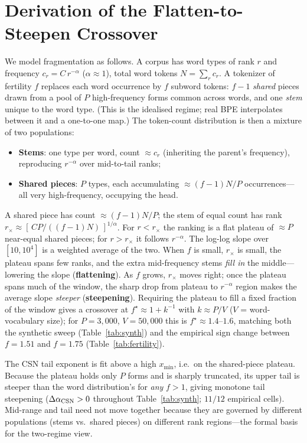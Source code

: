 \documentclass{article}
\begin{document}
\section{Derivation of the Flatten-to-Steepen Crossover}
\label{app:deriv}

We model fragmentation as follows. A corpus has word types of rank $r$ and frequency
$c_r = C\,r^{-\alpha}$ ($\alpha \approx 1$), total word tokens $N = \sum_r c_r$. A
tokenizer of fertility $f$ replaces each word occurrence by $f$ subword tokens: $f-1$
\emph{shared} pieces drawn from a pool of $P$ high-frequency forms common across words,
and one \emph{stem} unique to the word type. (This is the idealised regime; real BPE
interpolates between it and a one-to-one map.) The token-count distribution is then a
mixture of two populations:
\begin{itemize}
  \item \textbf{Stems}: one type per word, count $\approx c_r$ (inheriting the parent's
    frequency), reproducing $r^{-\alpha}$ over mid-to-tail ranks;
  \item \textbf{Shared pieces}: $P$ types, each accumulating $\approx (f-1)N/P$
    occurrences---all very high-frequency, occupying the head.
\end{itemize}

A shared piece has count $\approx (f-1)N/P$; the stem of equal count has rank
$r_\times \approx [\,CP/((f-1)N)\,]^{1/\alpha}$. For $r < r_\times$ the ranking is a flat
plateau of $\approx P$ near-equal shared pieces; for $r > r_\times$ it follows
$r^{-\alpha}$. The log-log slope over $[10, 10^4]$ is a weighted average of the two. When
$f$ is small, $r_\times$ is small, the plateau spans few ranks, and the extra
mid-frequency stems \emph{fill in} the middle---lowering the slope (\textbf{flattening}).
As $f$ grows, $r_\times$ moves right; once the plateau spans much of the window, the sharp
drop from plateau to $r^{-\alpha}$ region makes the average slope \emph{steeper}
(\textbf{steepening}). Requiring the plateau to fill a fixed fraction of the window gives
a crossover at $f^\star \approx 1 + k^{-1}$ with $k \approx P/V$ ($V$ = word-vocabulary
size); for $P=3{,}000$, $V=50{,}000$ this is $f^\star \approx 1.4$--$1.6$, matching both
the synthetic sweep (Table~\ref{tab:synth}) and the empirical sign change between
$f = 1.51$ and $f = 1.75$ (Table~\ref{tab:fertility}).

The CSN tail exponent is fit above a high $x_{\min}$, i.e.\ on the shared-piece plateau.
Because the plateau holds only $P$ forms and is sharply truncated, its upper tail is
steeper than the word distribution's for \emph{any} $f > 1$, giving monotone tail
steepening ($\Delta\alpha_{\rm CSN} > 0$ throughout Table~\ref{tab:synth}; $11/12$
empirical cells). Mid-range and tail need not move together because they are governed by
different populations (stems vs.\ shared pieces) on different rank regions---the formal
basis for the two-regime view.
\end{document}
